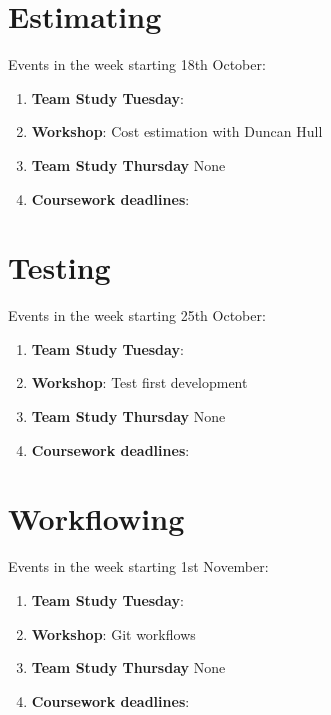 \documentclass[
]{book}
\providecommand{\tightlist}{%
  \setlength{\itemsep}{0pt}\setlength{\parskip}{0pt}}
\begin{document}
\hypertarget{week4}{%
\section{Estimating}\label{week4}}

Events in the week starting 18th October:

\begin{enumerate}
\def\labelenumi{\arabic{enumi}.}
\tightlist
\item
  \textbf{Team Study Tuesday}:
\item
  \textbf{Workshop}: Cost estimation with Duncan Hull
\item
  \textbf{Team Study Thursday} None
\item
  \textbf{Coursework deadlines}:
\end{enumerate}

\hypertarget{week5}{%
\section{Testing}\label{week5}}

Events in the week starting 25th October:

\begin{enumerate}
\def\labelenumi{\arabic{enumi}.}
\tightlist
\item
  \textbf{Team Study Tuesday}:
\item
  \textbf{Workshop}: Test first development
\item
  \textbf{Team Study Thursday} None
\item
  \textbf{Coursework deadlines}:
\end{enumerate}

\hypertarget{week6}{%
\section{Workflowing}\label{week6}}

Events in the week starting 1st November:

\begin{enumerate}
\def\labelenumi{\arabic{enumi}.}
\tightlist
\item
  \textbf{Team Study Tuesday}:
\item
  \textbf{Workshop}: Git workflows
\item
  \textbf{Team Study Thursday} None
\item
  \textbf{Coursework deadlines}:
\end{enumerate}
\end{document}
